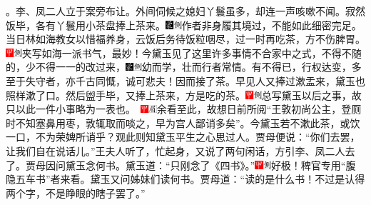 。李、凤二人立于案旁布让。外间伺候之媳妇丫鬟虽多，却连一声咳嗽不闻。寂然饭毕，各有丫鬟用小茶盘捧上茶来。{\includegraphics[width=3mm]{../Images/00006}\includegraphics[width=3mm]{../Images/00011}\footnotesize \kaishu 作者非身履其境过，不能如此细密完足。}当日林如海教女以惜福养身，云饭后务待饭粒咽尽，过一时再吃茶，方不伤脾胃。{\includegraphics[width=3mm]{../Images/00002}\includegraphics[width=3mm]{../Images/00011}\footnotesize \kaishu 夹写如海一派书气，最妙！}今黛玉见了这里许多事情不合家中之式，不得不随的，少不得一一的改过来，{\includegraphics[width=3mm]{../Images/00006}\includegraphics[width=3mm]{../Images/00011}\footnotesize \kaishu 幼而学，壮而行者常情。有不得已，行权达变，多至于失守者，亦千古同慨，诚可悲夫！}因而接了茶。早见人又捧过漱盂来，黛玉也照样漱了口。然后盥手毕，又捧上茶来，方是吃的茶。{\includegraphics[width=3mm]{../Images/00002}\includegraphics[width=3mm]{../Images/00011}\footnotesize \kaishu 总写黛玉以后之事，故只以此一件小事略为一表也。　\includegraphics[width=3mm]{../Images/00002}\includegraphics[width=3mm]{../Images/00010}\footnotesize \kaishu 余看至此，故想日前所阅``王敦初尚公主，登厕时不知塞鼻用枣，敦辄取而啖之，早为宫人鄙诮多矣''。今黛玉若不漱此茶，或饮一口，不为荣婢所诮乎？观此则知黛玉平生之心思过人。}贾母便说：``你们去罢，让我们自在说话儿。''王夫人听了，忙起身，又说了两句闲话，方引李、凤二人去了。贾母因问黛玉念何书。黛玉道：``只刚念了《四书》。''{\includegraphics[width=3mm]{../Images/00002}\includegraphics[width=3mm]{../Images/00011}\footnotesize \kaishu 好极！稗官专用``腹隐五车书''者来看。}黛玉又问姊妹们读何书。贾母道：``读的是什么书！不过是认得两个字，不是睁眼的瞎子罢了。''

